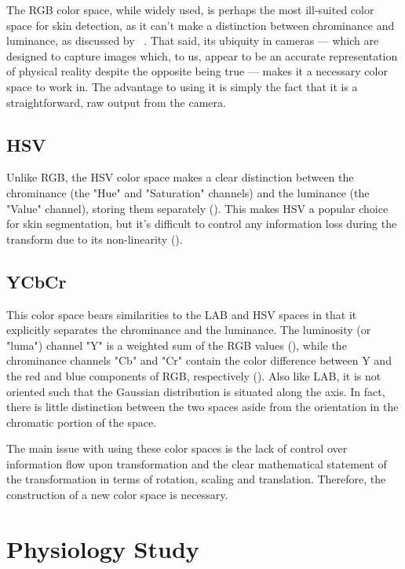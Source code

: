 The RGB color space, while widely used, is perhaps the most ill-suited color space for skin detection, as it can't make a distinction between chrominance and luminance, as discussed by ~\cite{Vezhnevets2003,Brand2000a}. That said, its ubiquity in cameras --- which are designed to capture images which, to us, appear to be an accurate representation of physical reality despite the opposite being true --- makes it a necessary color space to work in. The advantage to using it is simply the fact that it is a straightforward, raw output from the camera.

\subsection{HSV}\label{sec:HSV}

Unlike RGB, the HSV color space makes a clear distinction between the chrominance (the "Hue" and "Saturation" channels) and the luminance (the "Value" channel), storing them separately (\cite{Vezhnevets2003,Sigal2000a}). This makes HSV a popular choice for skin segmentation, but it's difficult to control any information loss during the transform due to its non-linearity (\cite{Poynton1997}).

\subsection{YCbCr}\label{sec:YCbCr}

This color space bears similarities to the LAB and HSV spaces in that it explicitly separates the chrominance and the luminance. The luminosity (or "luma") channel "Y" is a weighted sum of the RGB values (\cite{Poynton1997,Phung2002a}), while the chrominance channels "Cb" and "Cr" contain the color difference between Y and the red and blue components of RGB, respectively (\cite{Vezhnevets2003}). Also like LAB, it is not oriented such that the Gaussian distribution is situated along the axis. In fact, there is little distinction between the two spaces aside from the orientation in the chromatic portion of the space.

The main issue with using these color spaces is the lack of control over information flow upon transformation and the clear mathematical statement of the transformation in terms of rotation, scaling and translation. Therefore, the construction of a new color space is necessary.

\section{Physiology Study}\label{sec:PhysiologyStudy}

